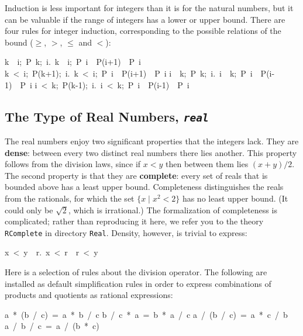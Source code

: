 Induction is less important for integers than it is for the natural numbers, but it can be valuable if the range of integers has a lower or upper bound.  There are four rules for integer induction, corresponding to the possible relations of the bound ($\geq$, $>$, $\leq$ and $<$):
\begin{isabelle}
\isasymlbrakk k\ \isasymle \ i;\ P\ k;\ \isasymAnd i.\ \isasymlbrakk k\ \isasymle \ i;\ P\ i\isasymrbrakk \ \isasymLongrightarrow \ P(i+1)\isasymrbrakk \ \isasymLongrightarrow \ P\ i%
\isanewline
\isasymlbrakk k\ <\ i;\ P(k+1);\ \isasymAnd i.\ \isasymlbrakk k\ <\ i;\ P\ i\isasymrbrakk \ \isasymLongrightarrow \ P(i+1)\isasymrbrakk \ \isasymLongrightarrow \ P\ i%
\isanewline
\isasymlbrakk i\ \isasymle \ k;\ P\ k;\ \isasymAnd i.\ \isasymlbrakk i\ \isasymle \ k;\ P\ i\isasymrbrakk \ \isasymLongrightarrow \ P(i-1)\isasymrbrakk \ \isasymLongrightarrow \ P\ i%
\isanewline
\isasymlbrakk i\ <\ k;\ P(k-1);\ \isasymAnd i.\ \isasymlbrakk i\ <\ k;\ P\ i\isasymrbrakk \ \isasymLongrightarrow \ P(i-1)\isasymrbrakk \ \isasymLongrightarrow \ P\ i%
\end{isabelle}


\subsection{The Type of Real Numbers, {\tt\slshape real}}

%
The real numbers enjoy two significant properties that the integers lack. 
They are
\textbf{dense}: between every two distinct real numbers there lies another.
This property follows from the division laws, since if $x<y$ then between
them lies $(x+y)/2$.  The second property is that they are
\textbf{complete}: every set of reals that is bounded above has a least
upper bound.  Completeness distinguishes the reals from the rationals, for
which the set $\{x\mid x^2<2\}$ has no least upper bound.  (It could only be
$\surd2$, which is irrational.)
The formalization of completeness is complicated; rather than
reproducing it here, we refer you to the theory \texttt{RComplete} in
directory \texttt{Real}.
Density, however, is trivial to express:
\begin{isabelle}
x\ <\ y\ \isasymLongrightarrow \ \isasymexists r.\ x\ <\ r\ \isasymand \ r\ <\ y%
\end{isabelle}

Here is a selection of rules about the division operator.  The following
are installed as default simplification rules in order to express
combinations of products and quotients as rational expressions:
\begin{isabelle}
a\ *\ (b\ /\ c)\ =\ a\ *\ b\ /\ c
\isanewline
b\ /\ c\ *\ a\ =\ b\ *\ a\ /\ c
\isanewline
a\ /\ (b\ /\ c)\ =\ a\ *\ c\ /\ b
\isanewline
a\ /\ b\ /\ c\ =\ a\ /\ (b\ *\ c)
\end{isabelle}

